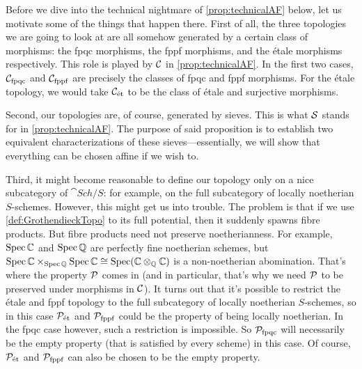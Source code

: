 \begin{rem*}\label{rem*:clarificationsForTechnicalAF}
	Before we dive into the technical nightmare of \cref{prop:technicalAF} below, let us motivate some of the things that happen there. First of all, the three topologies we are going to look at are all somehow generated by a certain class of morphisms: the fpqc morphisms, the fppf morphisms, and the étale morphisms respectively. This role is played by $\mathcal{C}$ in \cref{prop:technicalAF}. In the first two cases, $\mathcal{C}_{\mathrm{fpqc}}$ and $\mathcal{C}_{\mathrm{fppf}}$ are precisely the classes of fpqc and fppf morphisms. For the étale topology, we would take $\mathcal{C}_{\mathrm{\acute{e}t}}$ to be the class of étale and surjective morphisms.
	
	Second, our topologies are, of course, generated by sieves. This is what $\mathcal{S}$ stands for in \cref{prop:technicalAF}. The purpose of said proposition is to establish two equivalent characterizations of these sieves---essentially, we will show that everything can be chosen affine if we wish to.
	
	Third, it might become reasonable to define our topology only on a nice subcategory of $\cat{Sch}/S$: for example, on the full subcategory of locally noetherian $S$-schemes. However, this might get us into trouble. The problem is that if we use \cref{def:GrothendieckTopo} to its full potential, then it suddenly spawns fibre products. But fibre products need not preserve noetherianness. For example, $\operatorname{Spec} \mathbb{C}$ and $\operatorname{Spec} \mathbb{Q}$ are perfectly fine noetherian schemes, but $\operatorname{Spec} \mathbb{C}\times_{\operatorname{Spec} \mathbb{Q}}\operatorname{Spec} \mathbb{C}\cong \operatorname{Spec} (\mathbb{C}\otimes_{\mathbb{Q}}\mathbb{C})$ is a non-noetherian abomination. That's where the property $\mathcal{P}$ comes in (and in particular, that's why we need $\mathcal{P}$ to be preserved under morphisms in $\mathcal{C}$). It turns out that it's possible to restrict the étale and fppf topology to the full subcategory of locally noetherian $S$-schemes, so in this case $\mathcal{P}_{\mathrm{\acute{e}t}}$ and $\mathcal{P}_{\mathrm{fppf}}$ could be the property of being locally noetherian. In the fpqc case however, such a restriction is impossible. So $\mathcal{P}_{\mathrm{fpqc}}$ will necessarily be the empty property (that is satisfied by every scheme) in this case. Of course, $\mathcal{P}_{\mathrm{\acute{e}t}}$ and $\mathcal{P}_{\mathrm{fppf}}$ can also be chosen to be the empty property.
\end{rem*}
